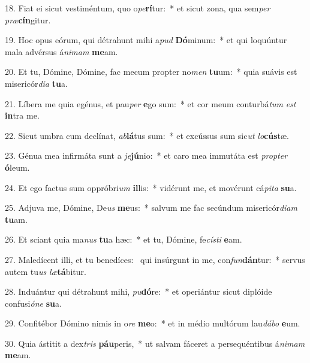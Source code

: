 18. Fiat ei sicut vestiméntum, quo o\textit{pe}\textbf{rí}tur:~*  et sicut zona, qua sem\textit{per} \textit{præ}\textbf{cín}gitur.\

19. Hoc opus eórum, qui détrahunt mihi a\textit{pud} \textbf{Dó}minum:~*  et qui loquúntur mala advérsus á\textit{ni}\textit{mam} \textbf{me}am.\

20. Et tu, Dómine, Dómine, fac mecum propter no\textit{men} \textbf{tu}um:~*  quia suávis est misericór\textit{di}\textit{a} \textbf{tu}a.\

21. Líbera me quia egénus, et pau\textit{per} \textbf{e}go sum:~*  et cor meum conturbá\textit{tum} \textit{est} \textbf{in}tra me.\

22. Sicut umbra cum declínat, \textit{ab}\textbf{lá}tus sum:~*  et excússus sum sic\textit{ut} \textit{lo}\textbf{cús}tæ.\

23. Génua mea infirmáta sunt a \textit{je}\textbf{jú}nio:~*  et caro mea immutáta est \textit{prop}\textit{ter} \textbf{ó}leum.\

24. Et ego factus sum oppróbri\textit{um} \textbf{il}lis:~*  vidérunt me, et movérunt cá\textit{pi}\textit{ta} \textbf{su}a.\

25. Adjuva me, Dómine, De\textit{us} \textbf{me}us:~*  salvum me fac secúndum misericór\textit{di}\textit{am} \textbf{tu}am.\

26. Et sciant quia ma\textit{nus} \textbf{tu}a hæc:~*  et tu, Dómine, fe\textit{cís}\textit{ti} \textbf{e}am.\

27. Maledícent illi, et tu benedíces: \dag\  qui insúrgunt in me, con\textit{fun}\textbf{dán}tur:~*  servus autem tu\textit{us} \textit{læ}\textbf{tá}bitur.\

28. Induántur qui détrahunt mihi, \textit{pu}\textbf{dó}re:~*  et operiántur sicut diplóide confusi\textit{ó}\textit{ne} \textbf{su}a.\

29. Confitébor Dómino nimis in o\textit{re} \textbf{me}o:~*  et in médio multórum lau\textit{dá}\textit{bo} \textbf{e}um.\

30. Quia ástitit a dex\textit{tris} \textbf{páu}peris,~*  ut salvam fáceret a persequéntibus á\textit{ni}\textit{mam} \textbf{me}am.\

